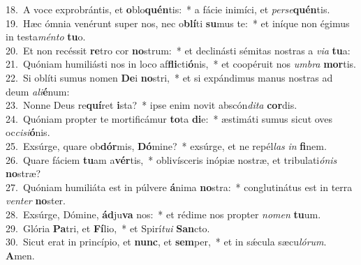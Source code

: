 {18.~}A voce exprobrántis, et \textbf{o}blo\textbf{quén}tis:~* a fácie inimíci, et \textit{per}\textit{se}\textbf{quén}tis.\\
{19.~}Hæc ómnia venérunt super nos, nec o\textbf{blí}ti \textbf{su}mus te:~* et iníque non égimus in testa\textit{mén}\textit{to} \textbf{tu}o.\\
{20.~}Et non recéssit \textbf{re}tro cor \textbf{no}strum:~* et declinásti sémitas nostras a \textit{vi}\textit{a} \textbf{tu}a:\\
{21.~}Quóniam humiliásti nos in loco af\textbf{fli}cti\textbf{ó}nis,~* et coopéruit nos \textit{um}\textit{bra} \textbf{mor}tis.\\
{22.~}Si oblíti sumus nomen \textbf{De}i \textbf{no}stri,~* et si expándimus manus nostras ad deum \textit{a}\textit{li}\textbf{é}num:\\
{23.~}Nonne Deus re\textbf{quí}ret \textbf{i}sta?~* ipse enim novit abscón\textit{di}\textit{ta} \textbf{cor}dis.\\
{24.~}Quóniam propter te mortificámur \textbf{to}ta \textbf{di}e:~* æstimáti sumus sicut oves oc\textit{ci}\textit{si}\textbf{ó}nis.\\
{25.~}Exsúrge, quare ob\textbf{dór}mis, \textbf{Dó}mine?~* exsúrge, et ne repél\textit{las} \textit{in} \textbf{fi}nem.\\
{26.~}Quare fáciem \textbf{tu}am a\textbf{vér}tis,~* oblivísceris inópiæ nostræ, et tribulati\textit{ó}\textit{nis} \textbf{no}stræ?\\
{27.~}Quóniam humiliáta est in púlvere \textbf{á}nima \textbf{no}stra:~* conglutinátus est in terra \textit{ven}\textit{ter} \textbf{no}ster.\\
{28.~}Exsúrge, Dómine, \textbf{ád}ju\textbf{va} nos:~* et rédime nos propter \textit{no}\textit{men} \textbf{tu}um.\\
{29.~}Glória \textbf{Pa}tri, et \textbf{Fí}lio,~* et Spirí\textit{tu}\textit{i} \textbf{San}cto.\\
{30.~}Sicut erat in princípio, et \textbf{nunc}, et \textbf{sem}per,~* et in sǽcula sæcu\textit{ló}\textit{rum}. \textbf{A}men.\\
